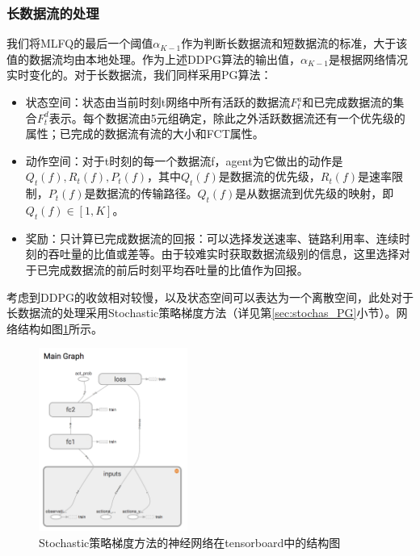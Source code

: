 \subsubsection{长数据流的处理}
我们将MLFQ的最后一个阈值$\alpha_{K-1}$作为判断长数据流和短数据流的标准，大于该值的数据流均由本地处理。作为上述DDPG算法的输出值，$\alpha_{K-1}$是根据网络情况实时变化的。对于长数据流，我们同样采用PG算法：
\begin{itemize}
    \item 状态空间：状态由当前时刻t网络中所有活跃的数据流$F_t^a$和已完成数据流的集合$F_t^d$表示。每个数据流由5元组确定，除此之外活跃数据流还有一个优先级的属性；已完成的数据流有流的大小和FCT属性。
    \item 动作空间：对于t时刻的每一个数据流f，agent为它做出的动作是${Q_{t}(f), R_{t}(f), P_{t}(f)}$，其中$Q_{t}(f)$是数据流的优先级，$R_{t}(f)$是速率限制，$P_{t}(f)$是数据流的传输路径。$Q_{t}(f)$是从数据流到优先级的映射，即$Q_{t}(f) \in [1,K]$。
    \item 奖励：只计算已完成数据流的回报：可以选择发送速率、链路利用率、连续时刻的吞吐量的比值或差等。由于较难实时获取数据流级别的信息，这里选择对于已完成数据流的前后时刻平均吞吐量的比值作为回报。
\end{itemize}
考虑到DDPG的收敛相对较慢，以及状态空间可以表达为一个离散空间，此处对于长数据流的处理采用Stochastic策略梯度方法（详见第\ref{sec:stochas_PG}小节）。网络结构如图\ref{fig:stochas_pg}所示。
\begin{figure}[ht]
\centering
\includegraphics[height=6cm]{figure/dpg.png}
\caption{Stochastic策略梯度方法的神经网络在tensorboard中的结构图}
\label{fig:stochas_pg}
\end{figure}

